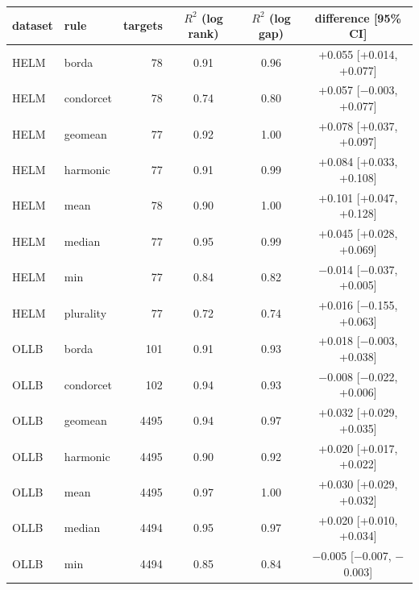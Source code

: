 \begin{tabular}{@{}llrccc@{}}
\toprule
dataset & rule & targets & $R^2$ (log rank) & $R^2$ (log gap) & difference [95\% CI] \\
\midrule
HELM & borda & 78 & 0.91 & 0.96 & +0.055 [+0.014, +0.077] \\
HELM & condorcet & 78 & 0.74 & 0.80 & +0.057 [$-$0.003, +0.077] \\
HELM & geomean & 77 & 0.92 & 1.00 & +0.078 [+0.037, +0.097] \\
HELM & harmonic & 77 & 0.91 & 0.99 & +0.084 [+0.033, +0.108] \\
HELM & mean & 78 & 0.90 & 1.00 & +0.101 [+0.047, +0.128] \\
HELM & median & 77 & 0.95 & 0.99 & +0.045 [+0.028, +0.069] \\
HELM & min & 77 & 0.84 & 0.82 & $-$0.014 [$-$0.037, +0.005] \\
HELM & plurality & 77 & 0.72 & 0.74 & +0.016 [$-$0.155, +0.063] \\
OLLB & borda & 101 & 0.91 & 0.93 & +0.018 [$-$0.003, +0.038] \\
OLLB & condorcet & 102 & 0.94 & 0.93 & $-$0.008 [$-$0.022, +0.006] \\
OLLB & geomean & 4495 & 0.94 & 0.97 & +0.032 [+0.029, +0.035] \\
OLLB & harmonic & 4495 & 0.90 & 0.92 & +0.020 [+0.017, +0.022] \\
OLLB & mean & 4495 & 0.97 & 1.00 & +0.030 [+0.029, +0.032] \\
OLLB & median & 4494 & 0.95 & 0.97 & +0.020 [+0.010, +0.034] \\
OLLB & min & 4494 & 0.85 & 0.84 & $-$0.005 [$-$0.007, $-$0.003] \\
\bottomrule
\end{tabular}
